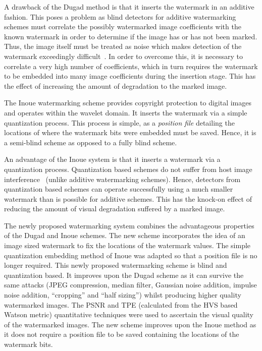 \documentclass[12pt]{report}
\begin{document}
A drawback of the Dugad method is that it inserts the watermark in an
additive fashion. This poses a problem as blind detectors for additive
watermarking schemes must correlate the possibly watermarked image coefficients with the known
watermark in order to determine if the image has or has not been marked. Thus,
the image itself must be treated as noise which makes detection of the watermark
exceedingly difficult~\cite{meerMasters}. In order to overcome this, it is 
necessary to correlate a very high number of coefficients, which in turn requires
the watermark to be embedded into many image coefficients during the insertion stage.
This has the effect of increasing the amount of degradation to the marked image.

The Inoue watermarking scheme provides copyright protection to 
digital images and operates within the wavelet domain. It inserts the
watermark via a simple quantization process. 
This process is simple, 
as a \emph{position file} detailing the locations of where the watermark
bits were embedded must be saved. Hence, it is a semi-blind scheme 
as opposed to a fully blind scheme. 

An advantage of the Inoue system is that it inserts a watermark via a quantization process.
Quantization based schemes
do not suffer from host image interference~\cite{meerMasters} (unlike
additive watermarking schemes). Hence, detectors from quantization based schemes
can operate successfully using a much smaller watermark than is possible for additive schemes.
This has the knock-on effect of reducing the amount of visual degradation suffered by a marked image.

The newly proposed watermarking system combines the advantageous properties
of the Dugad and Inoue schemes. The new scheme incorporates the idea of an image
sized watermark to fix the locations of the watermark values. The simple
quantization embedding method of Inoue was adapted so that a position file
is no longer required. This newly proposed watermarking scheme is blind and quantization based.
It improves upon the Dugad scheme as it can survive the same attacks  
(JPEG compression,
median filter,
Gaussian noise addition,
impulse noise addition,
``cropping'' and
``half sizing'')
whilst producing 
higher quality watermarked images.
The PSNR and TPE (calculated from the HVS based Watson metric) quantitative techniques 
were used to ascertain the visual quality of the watermarked images.
The new scheme improves upon the Inoue method as it does not require a position file to be saved containing the
locations of the watermark bits.
\end{document}
